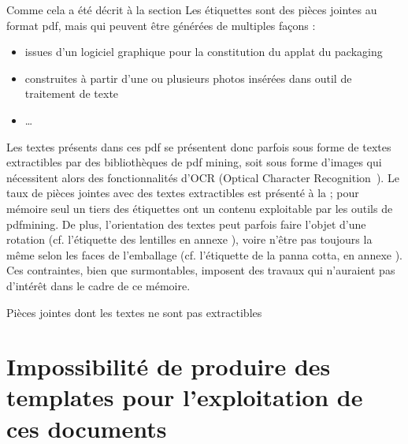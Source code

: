             Comme cela a été décrit à la section  Les étiquettes sont des pièces jointes au format pdf, mais qui peuvent être générées de multiples façons : 
            \begin{itemize}
                \item issues d'un logiciel graphique pour la constitution du applat du packaging
                \item construites à partir d'une ou plusieurs photos insérées dans outil de traitement de texte
                \item \dots
            \end{itemize}
            Les textes présents dans ces pdf se présentent donc parfois sous forme de textes extractibles par des bibliothèques de pdf mining, soit sous forme d'images qui nécessitent alors des fonctionnalités d'OCR (Optical Character Recognition~\cite{OCR_wiki}).
            Le taux de pièces jointes avec des textes extractibles est présenté à la  ; pour mémoire seul un tiers des étiquettes ont un contenu exploitable par les outils de pdfmining.
            De plus, l'orientation des textes peut parfois faire l'objet d'une rotation (cf. l'étiquette des lentilles en annexe ), voire n'être pas toujours la même selon les faces de l'emballage (cf. l'étiquette de la panna cotta, en annexe ).
            Ces contraintes, bien que surmontables, imposent des travaux qui n'auraient pas d'intérêt dans le cadre de ce mémoire.

            \begin{table}[htbp]
                \begin{center}
                
                \caption{Pièces jointes dont les textes ne sont pas extractibles}
                \label{tbl:empty_attached_files}
                \end{center}
            \end{table}


        
        \section{Impossibilité de produire des templates pour l'exploitation de ces documents}

